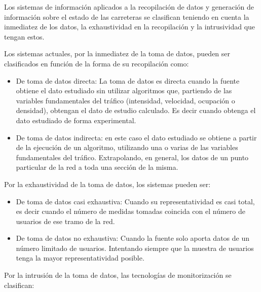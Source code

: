 \documentclass[twocolumn,twoside]{Jornadas}
\begin{document}
Los sistemas de información aplicados a la recopilación de datos y generación de información sobre el estado de las carreteras 
se clasifican teniendo en cuenta la inmediatez de los datos, la exhaustividad en la recopilación y la intrusividad que tengan estos.

Los sistemas actuales, por la inmediatez de la toma de datos, pueden ser clasificados en función de la forma de su recopilación como:

\begin{itemize}
 \item De toma de datos directa: La toma de datos es directa cuando la fuente obtiene el dato estudiado sin utilizar algoritmos que, partiendo de las variables 
fundamentales del tráfico (intensidad, velocidad, ocupación o densidad), obtengan el dato de estudio calculado. Es decir cuando obtenga el dato estudiado de forma experimental.

 \item De toma de datos indirecta: en este caso el dato estudiado se obtiene a partir de la ejecución de un algoritmo, utilizando una o 
varias de las variables fundamentales del tráfico. Extrapolando, en general, los datos de un punto particular de la red a toda una sección de la misma.
\end{itemize}

Por la exhaustividad de la toma de datos, los sistemas pueden ser:

\begin{itemize}

 \item De toma de datos casi exhaustiva: Cuando su representatividad es casi total, es decir cuando el número de medidas tomadas coincida con el número de 
usuarios de ese tramo de la red.

 \item De toma de datos no exhaustiva: Cuando la fuente solo aporta datos de un número limitado de usuarios. Intentando siempre que la muestra de usuarios tenga la mayor representatividad posible.
 
\end{itemize}

Por la intrusión de la toma de datos, las tecnologías de monitorización se clasifican:
\end{document}
